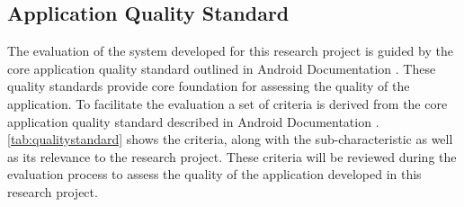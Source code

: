 \subsection{Application Quality Standard}
The evaluation of the system developed for this research project is guided by the core application quality standard outlined in Android Documentation \autocite{androidqualityguidelines}. These quality standards provide core foundation for assessing the quality of the application. 
To facilitate the evaluation a set of criteria is derived from the core application quality standard described in Android Documentation \autocite{androidqualityguidelines}. \autoref{tab:qualitystandard} shows the criteria, along with the sub-characteristic as well as its relevance to the research project. These criteria will be reviewed during the evaluation process to assess the quality of the application developed in this research project.
